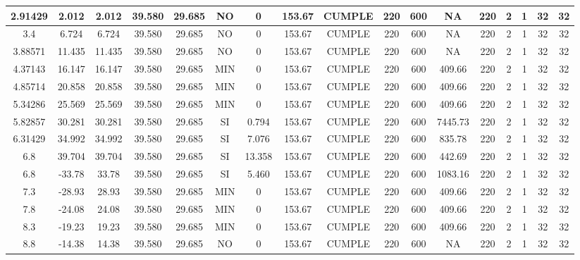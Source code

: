 \begin{table}[h]
{\begin{tabular}{|c|c|c|c|c|c|c|c|c|c|c|c|c|c|c|c|c|}
    \hline
    2.91429 & 2.012 & 2.012 & 39.580 & 29.685 & NO  & 0   & 153.67 & CUMPLE & 220 & 600 & NA  & 220 & 2   & 1   & 32  & 32 \bigstrut\\
    \hline
    3.4 & 6.724 & 6.724 & 39.580 & 29.685 & NO  & 0   & 153.67 & CUMPLE & 220 & 600 & NA  & 220 & 2   & 1   & 32  & 32 \bigstrut\\
    \hline
    3.88571 & 11.435 & 11.435 & 39.580 & 29.685 & NO  & 0   & 153.67 & CUMPLE & 220 & 600 & NA  & 220 & 2   & 1   & 32  & 32 \bigstrut\\
    \hline
    4.37143 & 16.147 & 16.147 & 39.580 & 29.685 & MIN & 0   & 153.67 & CUMPLE & 220 & 600 & 409.66 & 220 & 2   & 1   & 32  & 32 \bigstrut\\
    \hline
    4.85714 & 20.858 & 20.858 & 39.580 & 29.685 & MIN & 0   & 153.67 & CUMPLE & 220 & 600 & 409.66 & 220 & 2   & 1   & 32  & 32 \bigstrut\\
    \hline
    5.34286 & 25.569 & 25.569 & 39.580 & 29.685 & MIN & 0   & 153.67 & CUMPLE & 220 & 600 & 409.66 & 220 & 2   & 1   & 32  & 32 \bigstrut\\
    \hline
    5.82857 & 30.281 & 30.281 & 39.580 & 29.685 & SI  & 0.794 & 153.67 & CUMPLE & 220 & 600 & 7445.73 & 220 & 2   & 1   & 32  & 32 \bigstrut\\
    \hline
    6.31429 & 34.992 & 34.992 & 39.580 & 29.685 & SI  & 7.076 & 153.67 & CUMPLE & 220 & 600 & 835.78 & 220 & 2   & 1   & 32  & 32 \bigstrut\\
    \hline
    6.8 & 39.704 & 39.704 & 39.580 & 29.685 & SI  & 13.358 & 153.67 & CUMPLE & 220 & 600 & 442.69 & 220 & 2   & 1   & 32  & 32 \bigstrut\\
    \hline
    6.8 & -33.78 & 33.78 & 39.580 & 29.685 & SI  & 5.460 & 153.67 & CUMPLE & 220 & 600 & 1083.16 & 220 & 2   & 1   & 32  & 32 \bigstrut\\
    \hline
    7.3 & -28.93 & 28.93 & 39.580 & 29.685 & MIN & 0   & 153.67 & CUMPLE & 220 & 600 & 409.66 & 220 & 2   & 1   & 32  & 32 \bigstrut\\
    \hline
    7.8 & -24.08 & 24.08 & 39.580 & 29.685 & MIN & 0   & 153.67 & CUMPLE & 220 & 600 & 409.66 & 220 & 2   & 1   & 32  & 32 \bigstrut\\
    \hline
    8.3 & -19.23 & 19.23 & 39.580 & 29.685 & MIN & 0   & 153.67 & CUMPLE & 220 & 600 & 409.66 & 220 & 2   & 1   & 32  & 32 \bigstrut\\
    \hline
    8.8 & -14.38 & 14.38 & 39.580 & 29.685 & NO  & 0   & 153.67 & CUMPLE & 220 & 600 & NA  & 220 & 2   & 1   & 32  & 32 \bigstrut\\

\end{tabular}}
\end{table}
